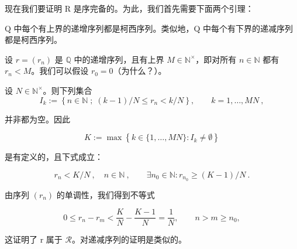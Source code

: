 现在我们要证明 R 是序完备的。为此，我们首先需要下面两个引理：

\begin{lemma}

Q 中每个有上界的递增序列都是柯西序列。类似地，Q 中每个有下界的递减序列都是柯西序列。

\proofhead
设  $ r = (r_n) $ 是  $ \mathbb{Q} $ 中的递增序列，且有上界  $ M \in \mathbb{N}^\times $，即对所有  $ n \in \mathbb{N} $ 都有  $ r_n < M $。我们可以假设  $ r_0 = 0 $（为什么？）。

设  $ N \in \mathbb{N}^\times $。则下列集合
\[
I_{k}:=\left\{n\in\mathbb{N}\;;\;(k-1)/N\leq r_{n}<k/N\right\},\qquad k=1,\ldots,M N~,
\]

并非都为空。因此

\[
K:=\max\left\{k\in\{1,\ldots,MN\}:I_{k}\neq\emptyset\right\}
\]

是有定义的，且下式成立：

\[
r_{n}<K/N~,\quad n\in\mathbb{N}~,\qquad\exists n_{0}\in\mathbb{N}\colon r_{n_{0}}\geq(K-1)/N~.
\]

由序列  $ (r_{n}) $ 的单调性，我们得到不等式

\[
0\leq r_{n}-r_{m}<\frac{K}{N}-\frac{K-1}{N}=\frac{1}{N},\qquad n>m\geq n_{0},
\]

这证明了 r 属于  $ \mathcal{R} $。对递减序列的证明是类似的。

\end{lemma}

